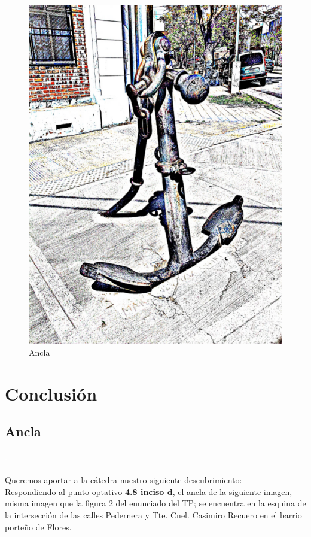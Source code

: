 \begin{figure}
  \begin{center}
    \includegraphics[scale=0.15]{imagenes/ancla.png}
  \end{center}
  \caption{Ancla}
\end{figure}
\par{
\section{Conclusión}
\bigskip
\subsection{Ancla}
}
\textcolor{white}{.}\\
\\
\bigskip
Queremos aportar a la cátedra nuestro siguiente descubrimiento: \\ 
Respondiendo al punto optativo \textbf{4.8 inciso d}, el ancla de la siguiente imagen, misma imagen que la figura 2 del enunciado del TP; se encuentra en la esquina de la intersección de las calles Pedernera y Tte. Cnel. Casimiro Recuero en el barrio porteño de Flores.

